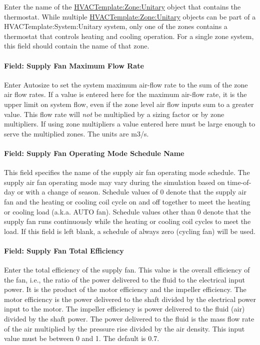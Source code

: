 Enter the name of the \hyperref[hvactemplatezoneunitary]{HVACTemplate:Zone:Unitary} object that contains the thermostat. While multiple \hyperref[hvactemplatezoneunitary]{HVACTemplate:Zone:Unitary} objects can be part of a HVACTemplate:System:Unitary system, only one of the zones contains a thermostat that controls heating and cooling operation. For a single zone system, this field should contain the name of that zone.

\paragraph{Field: Supply Fan Maximum Flow Rate}\label{field-supply-fan-maximum-flow-rate}

Enter Autosize to set the system maximum air-flow rate to the sum of the zone air flow rates. If a value is entered here for the maximum air-flow rate, it is the upper limit on system flow, even if the zone level air flow inputs sum to a greater value. This flow rate will \emph{not} be multiplied by a sizing factor or by zone multipliers. If using zone multipliers a value entered here must be large enough to serve the multiplied zones. The units are m3/s.

\paragraph{Field: Supply Fan Operating Mode Schedule Name}\label{field-supply-fan-operating-mode-schedule-name-4}

This field specifies the name of the supply air fan operating mode schedule. The supply air fan operating mode may vary during the simulation based on time-of-day or with a change of season. Schedule values of 0 denote that the supply air fan and the heating or cooling coil cycle on and off together to meet the heating or cooling load (a.k.a. AUTO fan). Schedule values other than 0 denote that the supply fan runs continuously while the heating or cooling coil cycles to meet the load. If this field is left blank, a schedule of always zero (cycling fan) will be used.

\paragraph{Field: Supply Fan Total Efficiency}\label{field-supply-fan-total-efficiency-5}

Enter the total efficiency of the supply fan. This value is the overall efficiency of the fan, i.e., the ratio of the power delivered to the fluid to the electrical input power. It is the product of the motor efficiency and the impeller efficiency. The motor efficiency is the power delivered to the shaft divided by the electrical power input to the motor. The impeller efficiency is power delivered to the fluid (air) divided by the shaft power. The power delivered to the fluid is the mass flow rate of the air multiplied by the pressure rise divided by the air density. This input value must be between 0 and 1. The default is 0.7.

